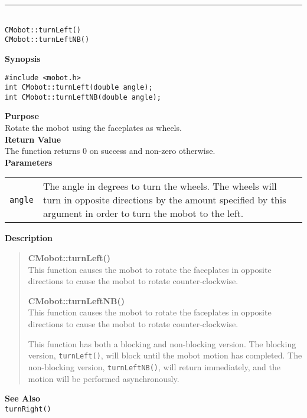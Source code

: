 \noindent
\vspace{5pt}
\rule{4.5in}{0.015in}\\
\noindent
{\LARGE \texttt{CMobot::turnLeft()}}\\
{\LARGE \texttt{CMobot::turnLeftNB()}}\\
{}

\noindent
{\bf Synopsis}
\vspace{-8pt}
\begin{verbatim}
#include <mobot.h>
int CMobot::turnLeft(double angle);
int CMobot::turnLeftNB(double angle);
\end{verbatim}

\noindent
{\bf Purpose}\\
Rotate the mobot using the faceplates as wheels.\\

\noindent
{\bf Return Value}\\
The function returns 0 on success and non-zero otherwise.\\

\noindent
{\bf Parameters}\\
\vspace{-0.1in}
\begin{description}
\item               
\begin{tabular}{p{10 mm}p{145 mm}}
\texttt{angle} & The angle in degrees to turn the wheels. The wheels will turn in opposite directions by the amount specified by this argument in order to turn the mobot to the left. \\
\end{tabular}
\end{description}

\noindent
{\bf Description}\\
\vspace{-12pt}
\begin{quote}
{\bf CMobot::turnLeft()}\\
This function causes the mobot to rotate the faceplates in opposite directions
to cause the mobot to rotate counter-clockwise.

{\bf CMobot::turnLeftNB()}\\
This function causes the mobot to rotate the faceplates in opposite directions
to cause the mobot to rotate counter-clockwise.

This function has both a blocking and non-blocking version.
The blocking version, \texttt{turnLeft()}, will block until the
mobot motion has completed. The non-blocking version, \texttt{turnLeftNB()},
will return immediately, and the motion will be performed asynchronously.\\
\end{quote}


\noindent
{\bf See Also}\\
\texttt{turnRight()}

